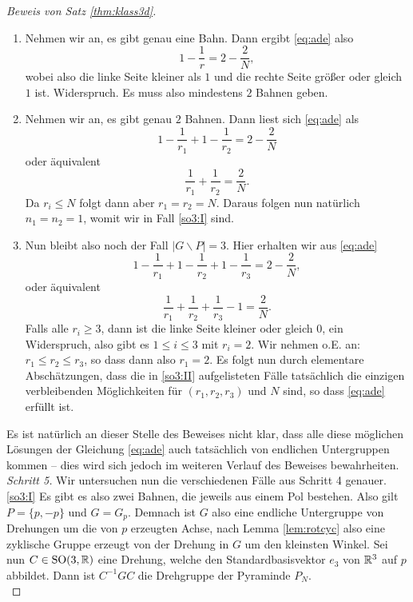 \documentclass{book}
\begin{document}
\begin{proof}[Beweis von Satz \ref{thm:klass3d}]
    \begin{enumerate}
        \item Nehmen wir an, es gibt genau eine Bahn. Dann ergibt \eqref{eq:ade} also
            \[
                1 - \frac{1}{r} = 2 - \frac{2}{N},  
            \]
            wobei also die linke Seite kleiner als $1$ und die rechte Seite größer oder gleich $1$ ist. Widerspruch. Es muss also mindestens $2$ Bahnen geben.
        \item Nehmen wir an, es gibt genau $2$ Bahnen. Dann liest sich \eqref{eq:ade} als
            \[
                1 - \frac{1}{r_1} +  1 - \frac{1}{r_2} = 2 - \frac{2}{N}  
            \]
            oder äquivalent
            \[
                \frac{1}{r_1} +\frac{1}{r_2} = \frac{2}{N}.  
            \]
            Da $r_i \le N$ folgt dann aber $r_1 = r_2 = N$. Daraus folgen nun natürlich $n_1 = n_2 = 1$, womit wir in Fall \ref{so3:I} sind.
        \item Nun bleibt also noch der Fall $|G \backslash P| = 3$. Hier erhalten wir aus \eqref{eq:ade}
            \[
                1 - \frac{1}{r_1} +  1 - \frac{1}{r_2} + 1 - \frac{1}{r_3} = 2 - \frac{2}{N},  
            \]
            oder äquivalent
            \[
                \frac{1}{r_1} + \frac{1}{r_2} + \frac{1}{r_3} - 1 = \frac{2}{N}.
            \]
            Falls alle $r_i \ge 3$, dann ist die linke Seite kleiner oder gleich
            $0$, ein Widerspruch, also gibt es $1 \le i \le 3$ mit $r_i = 2$.
            Wir nehmen o.E. an: $r_1 \le r_2 \le r_3$, so dass dann also $r_1 =
            2$. Es folgt nun durch elementare Abschätzungen, dass die in \ref{so3:II}
            aufgelisteten Fälle tatsächlich die einzigen verbleibenden
            Möglichkeiten für $(r_1,r_2,r_3)$ und $N$ sind, so dass
            \eqref{eq:ade} erfüllt ist.
    \end{enumerate}
    Es ist natürlich an dieser Stelle des Beweises nicht klar, dass alle diese
    möglichen Lösungen der Gleichung \eqref{eq:ade} auch tatsächlich von
    endlichen Untergruppen kommen -- dies wird sich jedoch im weiteren Verlauf
    des Beweises bewahrheiten.\\

    \noindent
    \emph{Schritt 5.} Wir untersuchen nun die verschiedenen Fälle aus Schritt 4
    genauer.\\

    \noindent
    \ref{so3:I} Es gibt es also zwei Bahnen, die jeweils aus einem
    Pol bestehen. Also gilt $P = \{p,-p\}$ und $G = G_p$. Demnach ist $G$ also
    eine endliche Untergruppe von Drehungen um die von $p$ erzeugten Achse,
    nach Lemma \ref{lem:rotcyc} also eine zyklische Gruppe erzeugt von der
    Drehung in $G$ um den kleinsten Winkel. Sei nun $C \in \operatorname{SO}(3,\mathbb{R})$ eine
    Drehung, welche den Standardbasisvektor $e_3$ von $\mathbb{R}^3$ auf $p$ abbildet.
    Dann ist $C^{-1} G C$ die Drehgruppe der Pyraminde $P_N$.\\ 


\end{proof}
\end{document}
